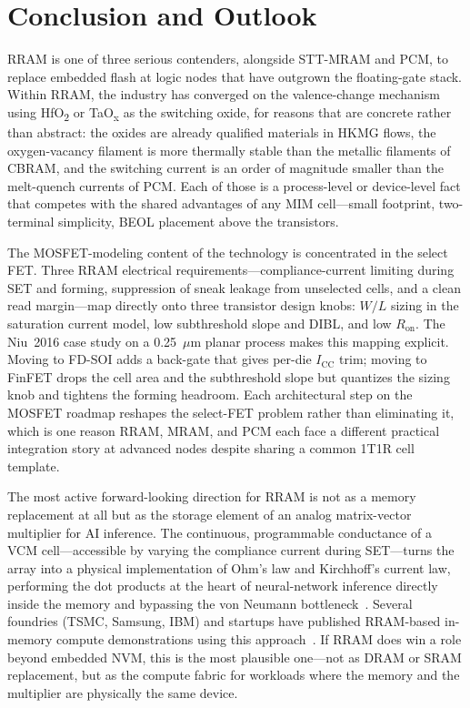 \documentclass[lettersize,journal]{IEEEtran}
\begin{document}
\section{Conclusion and Outlook}\label{sec:conclusion}
RRAM is one of three serious contenders, alongside STT-MRAM and PCM, to replace embedded flash at logic nodes that have outgrown the floating-gate stack. Within RRAM, the industry has converged on the valence-change mechanism using HfO\textsubscript{2} or TaO\textsubscript{x} as the switching oxide, for reasons that are concrete rather than abstract: the oxides are already qualified materials in HKMG flows, the oxygen-vacancy filament is more thermally stable than the metallic filaments of CBRAM, and the switching current is an order of magnitude smaller than the melt-quench currents of PCM. Each of those is a process-level or device-level fact that competes with the shared advantages of any MIM cell---small footprint, two-terminal simplicity, BEOL placement above the transistors.

The MOSFET-modeling content of the technology is concentrated in the select FET. Three RRAM electrical requirements---compliance-current limiting during SET and forming, suppression of sneak leakage from unselected cells, and a clean read margin---map directly onto three transistor design knobs: $W/L$ sizing in the saturation current model, low subthreshold slope and DIBL, and low $R_\mathrm{on}$. The Niu~2016 case study on a 0.25~$\mu$m planar process makes this mapping explicit. Moving to FD-SOI adds a back-gate that gives per-die $I_\mathrm{CC}$ trim; moving to FinFET drops the cell area and the subthreshold slope but quantizes the sizing knob and tightens the forming headroom. Each architectural step on the MOSFET roadmap reshapes the select-FET problem rather than eliminating it, which is one reason RRAM, MRAM, and PCM each face a different practical integration story at advanced nodes despite sharing a common 1T1R cell template.

The most active forward-looking direction for RRAM is not as a memory replacement at all but as the storage element of an analog matrix-vector multiplier for AI inference. The continuous, programmable conductance of a VCM cell---accessible by varying the compliance current during SET---turns the array into a physical implementation of Ohm's law and Kirchhoff's current law, performing the dot products at the heart of neural-network inference directly inside the memory and bypassing the von Neumann bottleneck~\cite{ref_ielmini_wong2018}. Several foundries (TSMC, Samsung, IBM) and startups have published RRAM-based in-memory compute demonstrations using this approach~\cite{ref_hellenbrand2024,ref_ielmini_wong2018}. If RRAM does win a role beyond embedded NVM, this is the most plausible one---not as DRAM or SRAM replacement, but as the compute fabric for workloads where the memory and the multiplier are physically the same device.
\end{document}
